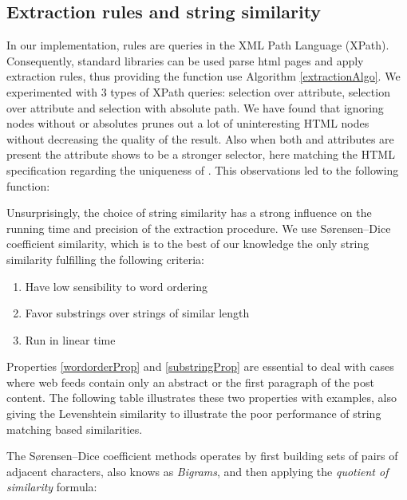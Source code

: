 \clearpage
\subsection{Extraction rules and string similarity}
In our implementation, rules are queries in the XML Path Language (XPath). Consequently, standard libraries can be used parse html pages and apply extraction rules, thus providing the  function use Algorithm \ref{extractionAlgo}. We experimented with 3 types of XPath queries: selection over  attribute, selection over  attribute and selection with absolute path. We have found that ignoring nodes without  or  absolutes prunes out a lot of uninteresting HTML nodes without decreasing  the quality of the result. Also when both  and  attributes are present the  attribute shows to be a stronger selector, here matching the HTML specification regarding the uniqueness of . This observations led to the following \code{\ref{allrulesAlgo}} function:

\allrulesAlgo

Unsurprisingly, the choice of string similarity has a strong influence on the running time and precision of the extraction procedure. We use Sørensen–Dice coefficient similarity\cite{dice1945}, which is to the best of our knowledge the only string similarity fulfilling the following criteria:

\begin{enumerate}
  \item \label{wordorderProp} Have low sensibility to word ordering
  \item \label{substringProp} Favor substrings over strings of similar length
  \item \label{lineraProp} Run in linear time
\end{enumerate}

Properties \ref{wordorderProp} and \ref{substringProp} are essential to deal with cases where web feeds contain only an abstract or the first paragraph of the post content. The following table illustrates these two properties with examples, also giving the Levenshtein\cite{levenshtein1966} similarity to illustrate the poor performance of string matching based similarities.

\similarityTable

The Sørensen–Dice coefficient methods operates by first building sets of pairs of adjacent characters, also knows as \emph{Bigrams}, and then applying the \emph{quotient of similarity} formula:

